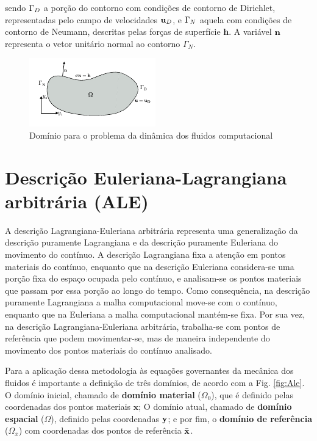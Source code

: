 \documentclass[tese_patricia]{subfiles}%
\begin{document}
\noindent sendo $\Gamma_{D}$ a porção do contorno com condições de contorno de Dirichlet, representadas pelo campo de velocidades $\mathbf{u}_D$, e $\Gamma_{N}$ aquela com condições de contorno de Neumann, descritas pelas forças de superfície $\mathbf{h}$. A variável $\mathbf{n}$ representa o vetor unitário normal ao contorno $\Gamma_{N}$.

\begin{figure}[htb!]
	\centering 
	\includegraphics[scale=3.0,trim=0cm 0.0cm 0cm 0.0cm, clip=true]{Imagens/Cap2/dominiofluido.pdf}	
	\caption{Domínio para o problema da dinâmica dos fluidos computacional}
	\label{fig:DomFluid}
\end{figure}

\section{Descrição Euleriana-Lagrangiana arbitrária (ALE)} \label{Capítulo2:ALE}

A descrição Lagrangiana-Euleriana arbitrária \cite{DoneaGH:1982} representa uma generalização da descrição puramente Lagrangiana e da descrição puramente Euleriana do movimento do contínuo. A descrição Lagrangiana fixa a atenção em pontos materiais do contínuo, enquanto que na descrição Euleriana considera-se uma porção fixa do espaço ocupada pelo contínuo, e analisam-se os pontos materiais que passam por essa porção ao longo do tempo. Como consequência, na descrição puramente Lagrangiana a malha computacional move-se com o contínuo, enquanto que na Euleriana a malha computacional mantém-se fixa. Por sua vez, na descrição Lagrangiana-Euleriana arbitrária, trabalha-se com pontos de referência que podem movimentar-se, mas de maneira independente do movimento dos pontos materiais do contínuo analisado.

Para a aplicação dessa metodologia às equações governantes da mecânica dos fluidos é importante a definição de três domínios, de acordo com a Fig. \ref{fig:Ale}. O domínio inicial, chamado de \textbf{domínio material} ($\Omega_0$), que é definido pelas coordenadas dos pontos materiais $\mathbf{x}$; O domínio atual, chamado de \textbf{domínio espacial} ($\Omega$), definido pelas coordenadas $\mathbf{y}$; e por fim, o \textbf{domínio de referência} ($\Omega_{\bar{x}}$) com coordenadas dos pontos de referência $\bar{\mathbf{x}}$. 
\end{document}
